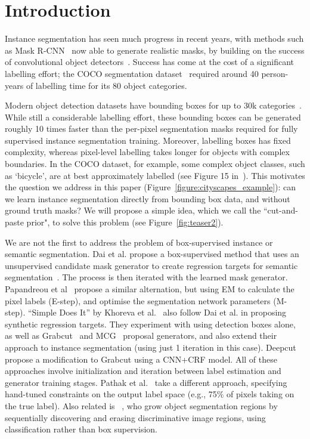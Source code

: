 \documentclass[runningheads]{llncs}
\begin{document}
\vspace{-2mm}
\section{Introduction}

Instance segmentation has seen much progress in recent years, with methods such as Mask R-CNN~\cite{he2017mask} now able to generate realistic masks, by building on the success of convolutional object detectors~\cite{ren2015faster,huang2016speed}.
Success has come at the cost of a significant labelling effort; the COCO segmentation dataset~\cite{lin2014microsoft} required around 40 person-years of labelling time for its 80 object categories.  

Modern object detection datasets have bounding boxes for up to 30k categories~\cite{krishna2017visual}. While still a considerable labelling effort, these bounding boxes can be generated roughly 10 times faster than the per-pixel segmentation masks required for fully supervised instance segmentation training. 
Moreover, labelling boxes has fixed complexity, whereas pixel-level labelling takes longer for objects with complex boundaries. In the COCO dataset,
for example, some complex object classes, such as `bicycle', are at best approximately labelled (see Figure 15 in~\cite{lin2014microsoft}). This motivates the question we address in this paper (Figure~\ref{figure:cityscapes_example}): can we learn instance
segmentation directly from bounding box data, and without ground truth masks?  We will propose a simple idea, which we call the ``cut-and-paste prior", to solve this problem (see Figure~\ref{fig:teaser2}). 


We are not the first to address the problem of box-supervised instance or semantic segmentation. Dai et al. propose a box-supervised method that uses an unsupervised candidate mask generator to create regression targets for semantic segmentation~\cite{dai2015boxsup}. The process is then iterated with the learned mask generator. Papandreou et al~\cite{papandreou2015weakly} propose a similar alternation, but using EM to calculate the pixel labels (E-step), and optimise the segmentation network parameters (M-step). ``Simple Does It'' by Khoreva et al.~\cite{khoreva2016simple} also follow Dai et al. in proposing synthetic regression targets. They experiment with using detection boxes alone, as well as Grabcut~\cite{rother2004grabcut} and MCG~\cite{pont2017multiscale} proposal generators, and also extend their approach to instance segmentation (using just 1 iteration in this case). Deepcut~\cite{rajchl2017deepcut} propose a modification to Grabcut using a CNN+CRF model. All of these approaches involve initialization and iteration between label estimation and generator training stages. Pathak et al.~\cite{pathak2015constrained} take a different approach, specifying hand-tuned constraints on the output label space (e.g., 75\% of pixels taking on the true label). Also related is ~\cite{wei2017object}, who grow object segmentation regions by sequentially discovering and erasing discriminative image regions, using classification rather than box supervision.
\end{document}

